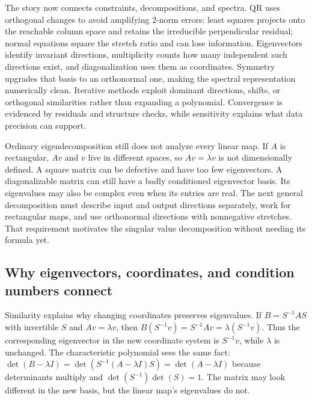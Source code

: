 The story now connects constraints, decompositions, and spectra. QR uses orthogonal changes to avoid amplifying 2-norm errors; least squares projects onto the reachable column space and retains the irreducible perpendicular residual; normal equations square the stretch ratio and can lose information. Eigenvectors identify invariant directions, multiplicity counts how many independent such directions exist, and diagonalization uses them as coordinates. Symmetry upgrades that basis to an orthonormal one, making the spectral representation numerically clean. Iterative methods exploit dominant directions, shifts, or orthogonal similarities rather than expanding a polynomial. Convergence is evidenced by residuals and structure checks, while sensitivity explains what data precision can support.

Ordinary eigendecomposition still does not analyze every linear map. If \(A\) is rectangular, \(Av\) and \(v\) live in different spaces, so \(Av=\lambda v\) is not dimensionally defined. A square matrix can be defective and have too few eigenvectors. A diagonalizable matrix can still have a badly conditioned eigenvector basis. Its eigenvalues may also be complex even when its entries are real. The next general decomposition must describe input and output directions separately, work for rectangular maps, and use orthonormal directions with nonnegative stretches. That requirement motivates the singular value decomposition without needing its formula yet.

\subsection{Why eigenvectors, coordinates, and condition numbers connect}\label{01-foundations-i-ch020-why-eigenvectors-coordinates-and-condition-numbers-connect}

Similarity explains why changing coordinates preserves eigenvalues. If \(B=S^{-1}AS\) with invertible \(S\) and \(Av=\lambda v\), then \(B(S^{-1}v)=S^{-1}Av=\lambda(S^{-1}v)\). Thus the corresponding eigenvector in the new coordinate system is \(S^{-1}v\), while \(\lambda\) is unchanged. The characteristic polynomial sees the same fact: \(\det(B-\lambda I)=\det(S^{-1}(A-\lambda I)S)=\det(A-\lambda I)\) because determinants multiply and \(\det(S^{-1})\det(S)=1\). The matrix may look different in the new basis, but the linear map's eigenvalues do not.

